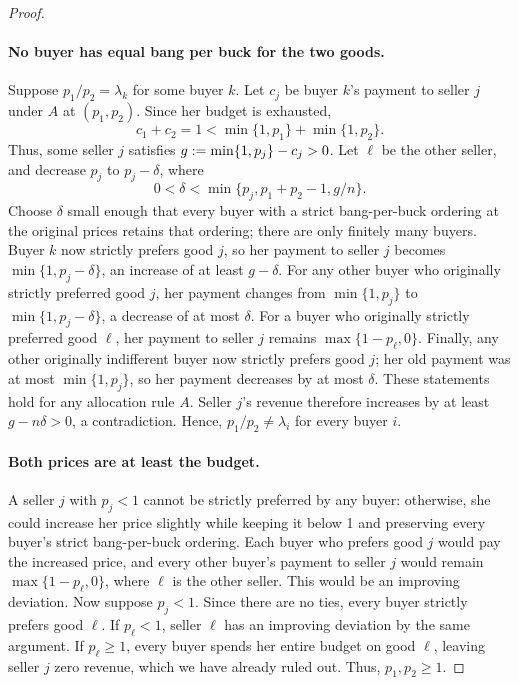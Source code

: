 \begin{proof}
\paragraph{No buyer has equal bang per buck for the two goods.}
Suppose $p_1 / p_2 = \lambda_k$ for some buyer $k$.
Let $c_j$ be buyer $k$'s payment to seller $j$ under $A$ at $(p_1, p_2)$.
Since her budget is exhausted,
\[ c_1 + c_2 = 1 < \min\{1, p_1\} + \min\{1, p_2\}. \]
Thus, some seller $j$ satisfies $g := \min\{1, p_j\} - c_j > 0$.
Let $\ell$ be the other seller, and decrease $p_j$ to $p_j - \delta$,
where
\[ 0 < \delta < \min\{p_j, p_1 + p_2 - 1, g / n\}. \]
Choose $\delta$ small enough that every buyer with a strict bang-per-buck ordering
at the original prices retains that ordering; there are only finitely many buyers.
Buyer $k$ now strictly prefers good $j$, so her payment to seller $j$ becomes
$\min\{1, p_j - \delta\}$, an increase of at least $g - \delta$.
For any other buyer who originally strictly preferred good $j$, her payment changes
from $\min\{1, p_j\}$ to $\min\{1, p_j - \delta\}$, a decrease of at most $\delta$.
For a buyer who originally strictly preferred good $\ell$, her payment to seller $j$
remains $\max\{1 - p_\ell, 0\}$.
Finally, any other originally indifferent buyer now strictly prefers good $j$;
her old payment was at most $\min\{1, p_j\}$, so her payment decreases by at most $\delta$.
These statements hold for any allocation rule $A$.
Seller $j$'s revenue therefore increases by at least $g - n \delta > 0$, a contradiction.
Hence, $p_1 / p_2 \neq \lambda_i$ for every buyer $i$.

\paragraph{Both prices are at least the budget.}
A seller $j$ with $p_j < 1$ cannot be strictly preferred by any buyer:
otherwise, she could increase her price slightly while keeping it below 1
and preserving every buyer's strict bang-per-buck ordering.
Each buyer who prefers good $j$ would pay the increased price,
and every other buyer's payment to seller $j$ would remain $\max\{1 - p_\ell, 0\}$,
where $\ell$ is the other seller. This would be an improving deviation.
Now suppose $p_j < 1$. Since there are no ties, every buyer strictly prefers good $\ell$.
If $p_\ell < 1$, seller $\ell$ has an improving deviation by the same argument.
If $p_\ell\ge1$, every buyer spends her entire budget on good $\ell$,
leaving seller $j$ zero revenue, which we have already ruled out.
Thus, $p_1, p_2\ge1$.


\end{proof}

